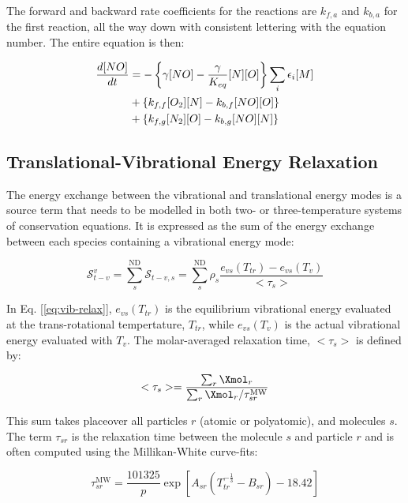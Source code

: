 \documentclass[10pt]{article}
\begin{document}
\begin{flushleft}
    The forward and backward rate coefficients for the reactions are $k_{f,a}$ and $k_{b,a}$ for the first reaction, all the way down with consistent lettering with the equation number. The entire equation is then:
    
    \begin{align*}
        \frac{d[NO]}{dt} &= -\left\{ \gamma [NO] - \frac{\gamma}{K_{eq}} [N][O] \right\} \sum_i \epsilon_i [M]
        \\ &+ \left\{ k_{f,f} [O_2][N] - k_{b,f} [NO][O] \right\}
        \\ &+ \left\{ k_{f,g} [N_2][O] - k_{b,g} [NO][N]  \right\}
    \end{align*}
    

\newpage

\subsection{Translational-Vibrational Energy Relaxation}
\label{sec:vib-trans-relax}

The energy exchange between the vibrational and translational energy modes is a source term that needs to be modelled in both two- or three-temperature systems of conservation equations. It is expressed as the sum of the energy exchange between each species containing a vibrational energy mode:

\begin{equation}
    \mathcal{S}_{t-v}^v = \sum_s^\text{ND} \mathcal{S}_{t-v,s} = \sum_s^\text{ND} \rho_s \frac{e_{vs}(T_{tr}) - e_{vs}(T_v)}{<\tau_s>}
    \label{eq:vib-relax}
\end{equation}

In Eq. [\ref{eq:vib-relax}], $e_{vs}(T_{tr})$ is the equilibrium vibrational energy evaluated at the trans-rotational tempertature, $T_{tr}$, while $e_{vs}(T_v)$ is the actual vibrational energy evaluated with $T_v$. The molar-averaged relaxation time, $<\tau_s>$ is defined by:

\begin{equation*}    
    <\tau_s> = \frac{\sum_r \Xmol_r}{\sum_r \Xmol_r / \tau_{sr}^\text{MW}}
\end{equation*}

This sum takes placeover all particles $r$ (atomic or polyatomic), and molecules $s$. The term $\tau_{sr}$ is the relaxation time between the molecule $s$ and particle $r$ and is often computed using the Millikan-White curve-fits:

\begin{equation*}
    \tau_{sr}^\text{MW} = \frac{101325}{p} \exp{[A_{sr} (T_{tr}^{-\frac{1}{3}} - B_{sr}) - 18.42]}
\end{equation*}


\end{flushleft}
\end{document}
